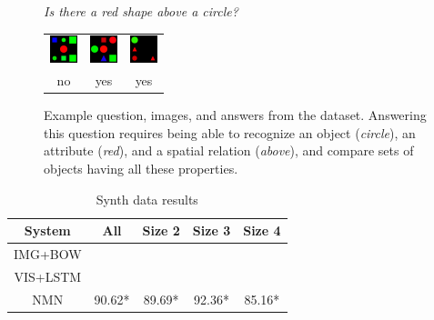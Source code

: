 \documentclass[10pt,twocolumn,letterpaper]{article}
\begin{document}
\begin{figure}
  \centering
  \emph{Is there a red shape above a circle?} \\[1em]
  \begin{tabular}{ccc}
    \includegraphics[width=0.25\columnwidth]{fig/shapes1} &
    \includegraphics[width=0.25\columnwidth]{fig/shapes2} &
    \includegraphics[width=0.25\columnwidth]{fig/shapes3} \\
    no & yes & yes
  \end{tabular}
  \caption{Example question, images, and answers from the \shapes dataset.
    Answering this question requires being able to recognize an object
    (\emph{circle}), an attribute (\emph{red}), and a spatial relation
    (\emph{above}), and compare sets of objects having all these properties.}
\end{figure}


\begin{table}
  \footnotesize
  \center
  \begin{tabular}{ccccc}
    \toprule
    System & All & Size 2 & Size 3 & Size 4 \\
    \midrule
    IMG+BOW & \\
    VIS+LSTM &  \\
    NMN & 90.62* & 89.69* & 92.36* & 85.16* \\
    \bottomrule
  \end{tabular}
  \caption{Synth data results}
\end{table}
\end{document}
